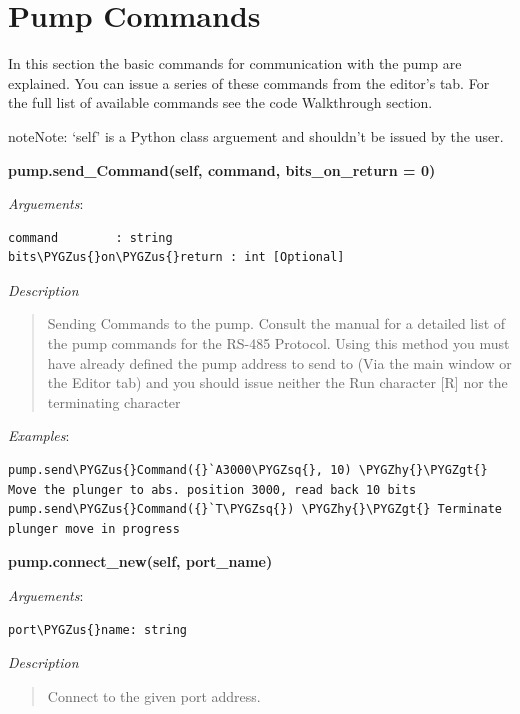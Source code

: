 \documentclass[letterpaper,10pt,english]{sphinxmanual}
\def\PYGZus{\char`\_}
\def\PYGZgt{\char`\>}
\def\PYGZhy{\char`\-}
\def\PYGZsq{\char`\'}
\begin{document}
\section{Pump Commands}
\label{pump-commands:pump-commands}\label{pump-commands::doc}
In this section the basic commands for communication with the pump are explained.
You can issue a series of these commands from the editor's tab.
For the full list of available commands see the code Walkthrough section.

\begin{notice}{note}{Note:}
`self' is a Python class arguement and shouldn't be issued by the user.
\end{notice}

\textbf{pump.send\_Command(self, command, bits\_on\_return = 0)}

\emph{Arguements}:

\begin{Verbatim}[commandchars=\\\{\}]
command        : string
bits\PYGZus{}on\PYGZus{}return : int [Optional]
\end{Verbatim}

\emph{Description}
\begin{quote}

Sending Commands to the pump.
Consult the manual for a detailed list of the pump commands for the RS-485 Protocol.
Using this method you must have already defined the pump address to send to (Via
the main window or the Editor tab) and you should issue neither
the Run character {[}R{]} nor the terminating character
\end{quote}

\emph{Examples}:

\begin{Verbatim}[commandchars=\\\{\}]
pump.send\PYGZus{}Command({}`A3000\PYGZsq{}, 10) \PYGZhy{}\PYGZgt{} Move the plunger to abs. position 3000, read back 10 bits
pump.send\PYGZus{}Command({}`T\PYGZsq{}) \PYGZhy{}\PYGZgt{} Terminate plunger move in progress
\end{Verbatim}

\textbf{pump.connect\_new(self, port\_name)}

\emph{Arguements}:

\begin{Verbatim}[commandchars=\\\{\}]
port\PYGZus{}name: string
\end{Verbatim}

\emph{Description}
\begin{quote}

Connect to the given port address.
\end{quote}
\end{document}
